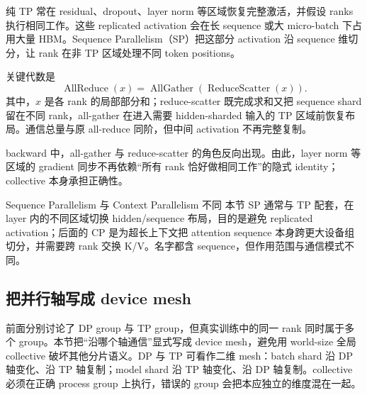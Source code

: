 纯 TP 常在 residual、dropout、layer norm 等区域恢复完整激活，并假设 ranks 执行相同工作。这些 replicated activation 会在长 sequence 或大 micro-batch 下占用大量 HBM。Sequence Parallelism（SP）把这部分 activation 沿 sequence 维切分，让 rank 在非 TP 区域处理不同 token positions。


关键代数是
\[
\operatorname{AllReduce}(x)
=\operatorname{AllGather}(\operatorname{ReduceScatter}(x)).
\]
其中，$x$ 是各 rank 的局部部分和；reduce-scatter 既完成求和又把 sequence shard 留在不同 rank，all-gather 在进入需要 hidden-sharded 输入的 TP 区域前恢复布局。通信总量与原 all-reduce 同阶，但中间 activation 不再完整复制。


backward 中，all-gather 与 reduce-scatter 的角色反向出现。由此，layer norm 等区域的 gradient 同步不再依赖“所有 rank 恰好做相同工作”的隐式 identity；collective 本身承担正确性。



\begin{warningbox}{Sequence Parallelism 与 Context Parallelism 不同}
本节 SP 通常与 TP 配套，在 layer 内的不同区域切换 hidden/sequence 布局，目的是避免 replicated activation；后面的 CP 是为超长上下文把 attention sequence 本身跨更大设备组切分，并需要跨 rank 交换 K/V。名字都含 sequence，但作用范围与通信模式不同。
\end{warningbox}

\subsection{把并行轴写成 device mesh}

前面分别讨论了 DP group 与 TP group，但真实训练中的同一 rank 同时属于多个 group。本节把“沿哪个轴通信”显式写成 device mesh，避免用 world-size 全局 collective 破坏其他分片语义。DP 与 TP 可看作二维 mesh：batch shard 沿 DP 轴变化、沿 TP 轴复制；model shard 沿 TP 轴变化、沿 DP 轴复制。collective 必须在正确 process group 上执行，错误的 group 会把本应独立的维度混在一起。

